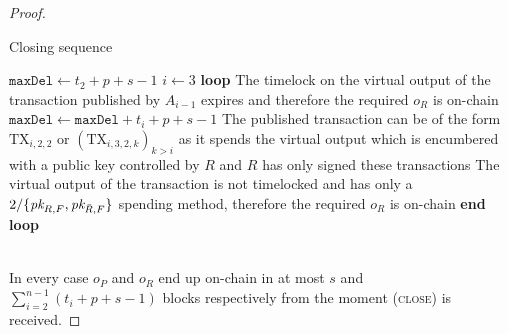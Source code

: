 \begin{proof}
  \begin{center}
    \begin{notitlebox}{Closing sequence}
      \begin{algorithmic}[1]
        \State $\texttt{maxDel} \gets t_2 + p + s - 1$ 
        \State $i \gets 3$
        \State \textbf{loop}
        \Indent
            \State The timelock on the virtual output of the transaction
            published by $A_{i-1}$ expires and therefore the required $o_R$ is
            on-chain
          \Else \: 
            \State $\texttt{maxDel} \gets \texttt{maxDel} + t_i + p + s - 1$
            \State The published transaction can be of the form $\mathrm{TX}_{i,
            2, 2}$ or $(\mathrm{TX}_{i, 3, 2, k})_{k > i}$ as it spends the
            virtual output which is encumbered with a public key controlled by
            $R$ and $R$ has only signed these transactions
             
              \State The virtual output of the transaction is not timelocked and
              has only a $2/\{\textit{pk}_{R, F}, \textit{pk}_{\bar{R}, F}\}$ spending method,
              therefore the required $o_R$ is on-chain
            \Else \: 
            \EndIf
          \EndIf
        \EndIndent
        \State \textbf{end loop}
        \State {}
      \end{algorithmic}
    \end{notitlebox}
    \label{code:settling-process}
  \end{center} \ \\

  In every case $o_P$ and $o_R$ end up on-chain in at most $s$ and
  $\sum\limits_{i=2}^{n-1}(t_i + p + s - 1)$ blocks respectively from the moment
  (\textsc{close}) is received.


\end{proof}
